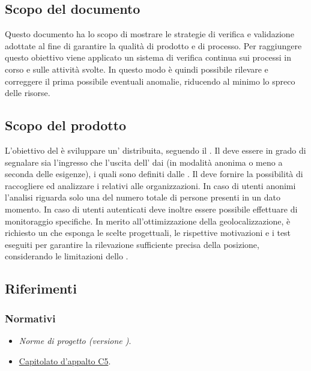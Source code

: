 \documentclass[../piano-di-qualifica.tex]{subfiles}
\begin{document}
\subsection{Scopo del documento}%
\label{sub:scopo_del_documento}
Questo documento ha lo scopo di mostrare le strategie di verifica e validazione adottate al fine di garantire la qualità di prodotto e di processo.
Per raggiungere questo obiettivo viene applicato un sistema di verifica continua sui processi in corso e sulle attività svolte.
In questo modo è quindi possibile rilevare e correggere il prima possibile eventuali anomalie, riducendo al minimo lo spreco delle risorse.

\subsection{Scopo del prodotto}%
\label{sub:scopo_del_prodotto}
L'obiettivo del  è sviluppare un' distribuita, seguendo il .
Il  deve essere in grado di segnalare sia l'ingresso che l'uscita dell' dai  (in modalità anonima o meno a seconda delle esigenze), i quali sono definiti dalle .
Il  deve fornire la possibilità di raccogliere ed analizzare i  relativi alle organizzazioni.
In caso di utenti anonimi l'analisi riguarda solo una  del numero totale di persone presenti in un dato momento.
In caso di utenti autenticati deve inoltre essere possibile effettuare  di monitoraggio specifiche.
In merito all'ottimizzazione della geolocalizzazione, è richiesto un  che esponga le scelte progettuali, le rispettive motivazioni e i test eseguiti per garantire la rilevazione sufficiente precisa della posizione, considerando le limitazioni dello .


\scopoDelProdottoEGlossario{}

\subsection{Riferimenti}%
\label{sub:riferimenti}
\subsubsection{Normativi}%
\label{par:normativi}
\begin{itemize}
  \item \textit{Norme di progetto (versione \versione)}.
  \item \href{https://www.math.unipd.it/~tullio/IS-1/2019/Progetto/C5.pdf}{Capitolato d'appalto C5}.
\end{itemize}
\end{document}
